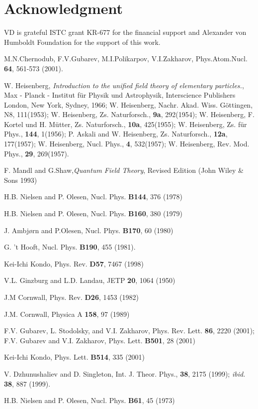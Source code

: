 \documentclass[a4paper,aps,showpacs]{revtex4}
\begin{document}
\section{Acknowledgment}

VD is grateful ISTC grant KR-677 for the financial support and
Alexander von Humboldt Foundation for the support of this work.

\begin{thebibliography}{99}

M.N.Chernodub, F.V.Gubarev, M.I.Polikarpov, V.I.Zakharov,
Phys.Atom.Nucl. \textbf{64},  561-573 (2001).

W. Heisenberg, \textit{Introduction to the unified field theory of
elementary particles.}, Max - Planck - Institut f\"ur Physik und
Astrophysik, Interscience Publishers London, New York, Sydney,
1966; W. Heisenberg, Nachr. Akad. Wiss. G\"ottingen, N8,
111(1953); W. Heisenberg, Zs. Naturforsch., \textbf{9a},
292(1954); W. Heisenberg, F. Kortel und H. M\"utter, Zs.
Naturforsch., \textbf{10a}, 425(1955); W. Heisenberg, Zs. f\"ur
Phys., \textbf{144}, 1(1956); P. Askali and W. Heisenberg, Zs.
Naturforsch., \textbf{12a}, 177(1957); W. Heisenberg, Nucl. Phys.,
\textbf{4}, 532(1957); W. Heisenberg, Rev. Mod. Phys., \textbf{29},
269(1957).

 F. Mandl and G.Shaw,{\it Quantum Field Theory},
Revised Edition (John Wiley \& Sons 1993)

 H.B. Nielsen and P. Olesen, Nucl. Phys. \textbf{B144},
376 (1978) 

 H.B. Nielsen and P. Olesen, Nucl. Phys. \textbf{B160},
380 (1979)

 J. Ambj{\o}rn and P.Olesen, Nucl. Phys. \textbf{B170},
60 (1980)

 G. 't Hooft, Nucl. Phys. \textbf{B190}, 455 (1981).

 Kei-Ichi Kondo, Phys. Rev. \textbf{D57}, 7467 (1998)

 V.L. Ginzburg and L.D. Landau, JETP \textbf{20},
1064 (1950)

 J.M Cornwall, Phys. Rev. \textbf{D26}, 1453 (1982)

 J.M. Cornwall, Physica A \textbf{158}, 97 (1989)

 F.V. Gubarev, L. Stodolsky, and V.I. Zakharov,
Phys. Rev. Lett. \textbf{86}, 2220 (2001); F.V. Gubarev and V.I. Zakharov,
Phys. Lett. \textbf{B501}, 28 (2001)

 Kei-Ichi Kondo, Phys. Lett. \textbf{B514}, 335 (2001)

 V. Dzhunushaliev and D. Singleton, Int. J. Theor. Phys.,
\textbf{38}, 2175 (1999); \textit{ibid.} \textbf{38}, 887 (1999).

 H.B. Nielsen and P. Olesen, Nucl. Phys. \textbf{B61}, 45 (1973)

\end{thebibliography}
\end{document}
